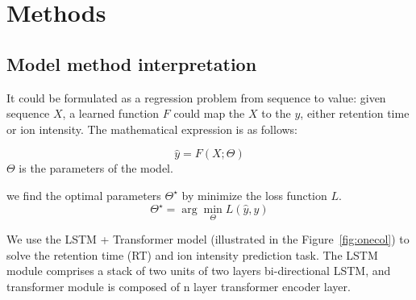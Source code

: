 \documentclass[final]{cvpr}
\begin{document}
\section{Methods}

\subsection{Model method interpretation}

It could be formulated as a regression problem from sequence to value: given sequence \( X \), a learned 
function \( F \) could map the \( X \) to the \( y \), either retention time or ion intensity. The mathematical expression is as follows: 

\[ \hat{y} = F(X;\Theta) \]
$\Theta$ is the parameters of the model.

we find the optimal parameters \( \Theta^\star\) by minimize the loss function \( L \).
\[ \Theta^\star = \arg\min_{\Theta} L(\hat{y},  y) \]


We use the LSTM + Transformer model (illustrated in the Figure~\ref{fig:onecol}) to solve the retention time (RT) and ion intensity prediction task. 
The LSTM module comprises a stack of two units of two layers bi-directional LSTM, and transformer module is composed of 
n layer transformer encoder layer. 
\end{document}
